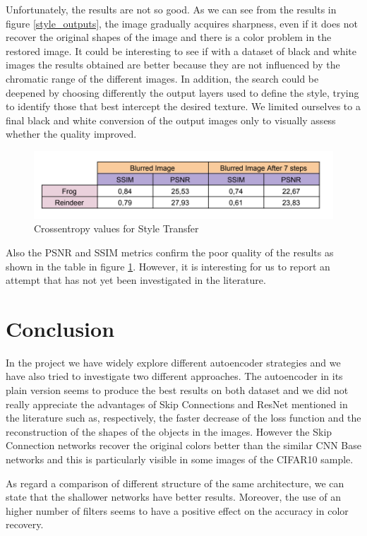 \documentclass[12pt,a4paper]{report}
\begin{document}
Unfortunately, the results are not so good. As we can see from the results in figure \ref{style_outputs}, the image gradually acquires sharpness, even if it does not recover the original shapes of the image and there is a color problem in the restored image. It could be interesting to see if with a dataset of black and white images the results obtained are better because they are not influenced by the chromatic range of the different images. In addition, the search could be deepened by choosing differently the output layers used to define the style, trying to identify those that best intercept the desired texture. We limited ourselves to a final black and white conversion of the output images only to visually assess whether the quality improved. 

\begin{figure}[hptb]
\centering
\includegraphics[scale=0.5]{style_transfer.png} 
\caption{Crossentropy values for Style Transfer}
\label{style}
\end{figure}

Also the PSNR and SSIM metrics confirm the poor quality of the results as shown in the table in  figure \ref{style}. However, it is interesting for us to report an attempt that has not yet been investigated in the literature.

\section*{Conclusion}
In the project we have widely explore different autoencoder strategies and we have also tried to investigate two different approaches. The autoencoder in its plain version seems to produce the best results on both dataset and we did not really appreciate the advantages of Skip Connections and ResNet mentioned in the literature such as, respectively, the faster decrease of the loss function and the reconstruction of the shapes of the objects in the images. However the Skip Connection networks recover the original colors better than the similar CNN Base networks and this is particularly visible in some images of the CIFAR10 sample.

As regard a comparison of different structure of the same architecture, we can state that the shallower networks have better results. Moreover, the use of an higher number of filters seems to have a positive effect on the accuracy in color recovery.
\end{document}
